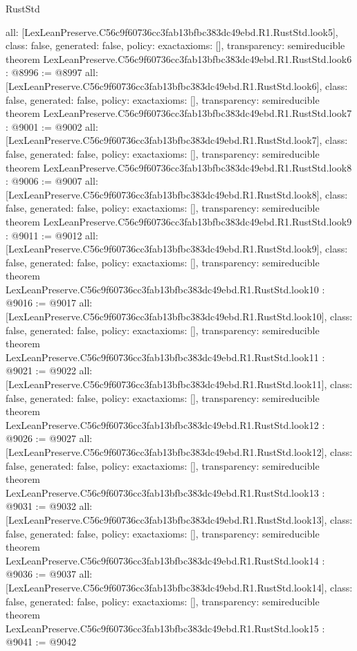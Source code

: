 \begin{lexlean}{RustStd}
\begin{coremodule}
{  all: [LexLeanPreserve.C56c9f60736cc3fab13bfbc383dc49ebd.R1.RustStd.look5],
  class: false,
  generated: false,
  policy: exact{axioms: []},
  transparency: semireducible
}
theorem LexLeanPreserve.C56c9f60736cc3fab13bfbc383dc49ebd.R1.RustStd.look6 : @8996 := @8997 {
  all: [LexLeanPreserve.C56c9f60736cc3fab13bfbc383dc49ebd.R1.RustStd.look6],
  class: false,
  generated: false,
  policy: exact{axioms: []},
  transparency: semireducible
}
theorem LexLeanPreserve.C56c9f60736cc3fab13bfbc383dc49ebd.R1.RustStd.look7 : @9001 := @9002 {
  all: [LexLeanPreserve.C56c9f60736cc3fab13bfbc383dc49ebd.R1.RustStd.look7],
  class: false,
  generated: false,
  policy: exact{axioms: []},
  transparency: semireducible
}
theorem LexLeanPreserve.C56c9f60736cc3fab13bfbc383dc49ebd.R1.RustStd.look8 : @9006 := @9007 {
  all: [LexLeanPreserve.C56c9f60736cc3fab13bfbc383dc49ebd.R1.RustStd.look8],
  class: false,
  generated: false,
  policy: exact{axioms: []},
  transparency: semireducible
}
theorem LexLeanPreserve.C56c9f60736cc3fab13bfbc383dc49ebd.R1.RustStd.look9 : @9011 := @9012 {
  all: [LexLeanPreserve.C56c9f60736cc3fab13bfbc383dc49ebd.R1.RustStd.look9],
  class: false,
  generated: false,
  policy: exact{axioms: []},
  transparency: semireducible
}
theorem LexLeanPreserve.C56c9f60736cc3fab13bfbc383dc49ebd.R1.RustStd.look10 : @9016 := @9017 {
  all: [LexLeanPreserve.C56c9f60736cc3fab13bfbc383dc49ebd.R1.RustStd.look10],
  class: false,
  generated: false,
  policy: exact{axioms: []},
  transparency: semireducible
}
theorem LexLeanPreserve.C56c9f60736cc3fab13bfbc383dc49ebd.R1.RustStd.look11 : @9021 := @9022 {
  all: [LexLeanPreserve.C56c9f60736cc3fab13bfbc383dc49ebd.R1.RustStd.look11],
  class: false,
  generated: false,
  policy: exact{axioms: []},
  transparency: semireducible
}
theorem LexLeanPreserve.C56c9f60736cc3fab13bfbc383dc49ebd.R1.RustStd.look12 : @9026 := @9027 {
  all: [LexLeanPreserve.C56c9f60736cc3fab13bfbc383dc49ebd.R1.RustStd.look12],
  class: false,
  generated: false,
  policy: exact{axioms: []},
  transparency: semireducible
}
theorem LexLeanPreserve.C56c9f60736cc3fab13bfbc383dc49ebd.R1.RustStd.look13 : @9031 := @9032 {
  all: [LexLeanPreserve.C56c9f60736cc3fab13bfbc383dc49ebd.R1.RustStd.look13],
  class: false,
  generated: false,
  policy: exact{axioms: []},
  transparency: semireducible
}
theorem LexLeanPreserve.C56c9f60736cc3fab13bfbc383dc49ebd.R1.RustStd.look14 : @9036 := @9037 {
  all: [LexLeanPreserve.C56c9f60736cc3fab13bfbc383dc49ebd.R1.RustStd.look14],
  class: false,
  generated: false,
  policy: exact{axioms: []},
  transparency: semireducible
}
theorem LexLeanPreserve.C56c9f60736cc3fab13bfbc383dc49ebd.R1.RustStd.look15 : @9041 := @9042 {
}
\end{coremodule}
\end{lexlean}
